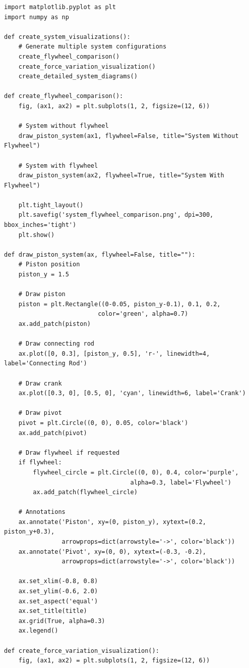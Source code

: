 \documentclass[10pt]{article}
\begin{document}
\begin{verbatim}
import matplotlib.pyplot as plt
import numpy as np

def create_system_visualizations():
    # Generate multiple system configurations
    create_flywheel_comparison()
    create_force_variation_visualization()
    create_detailed_system_diagrams()

def create_flywheel_comparison():
    fig, (ax1, ax2) = plt.subplots(1, 2, figsize=(12, 6))
    
    # System without flywheel
    draw_piston_system(ax1, flywheel=False, title="System Without Flywheel")
    
    # System with flywheel
    draw_piston_system(ax2, flywheel=True, title="System With Flywheel")
    
    plt.tight_layout()
    plt.savefig('system_flywheel_comparison.png', dpi=300, bbox_inches='tight')
    plt.show()

def draw_piston_system(ax, flywheel=False, title=""):
    # Piston position
    piston_y = 1.5
    
    # Draw piston
    piston = plt.Rectangle((0-0.05, piston_y-0.1), 0.1, 0.2, 
                          color='green', alpha=0.7)
    ax.add_patch(piston)
    
    # Draw connecting rod
    ax.plot([0, 0.3], [piston_y, 0.5], 'r-', linewidth=4, label='Connecting Rod')
    
    # Draw crank
    ax.plot([0.3, 0], [0.5, 0], 'cyan', linewidth=6, label='Crank')
    
    # Draw pivot
    pivot = plt.Circle((0, 0), 0.05, color='black')
    ax.add_patch(pivot)
    
    # Draw flywheel if requested
    if flywheel:
        flywheel_circle = plt.Circle((0, 0), 0.4, color='purple', 
                                   alpha=0.3, label='Flywheel')
        ax.add_patch(flywheel_circle)
    
    # Annotations
    ax.annotate('Piston', xy=(0, piston_y), xytext=(0.2, piston_y+0.3),
                arrowprops=dict(arrowstyle='->', color='black'))
    ax.annotate('Pivot', xy=(0, 0), xytext=(-0.3, -0.2),
                arrowprops=dict(arrowstyle='->', color='black'))
    
    ax.set_xlim(-0.8, 0.8)
    ax.set_ylim(-0.6, 2.0)
    ax.set_aspect('equal')
    ax.set_title(title)
    ax.grid(True, alpha=0.3)
    ax.legend()

def create_force_variation_visualization():
    fig, (ax1, ax2) = plt.subplots(1, 2, figsize=(12, 6))
    

\end{verbatim}
\end{document}
